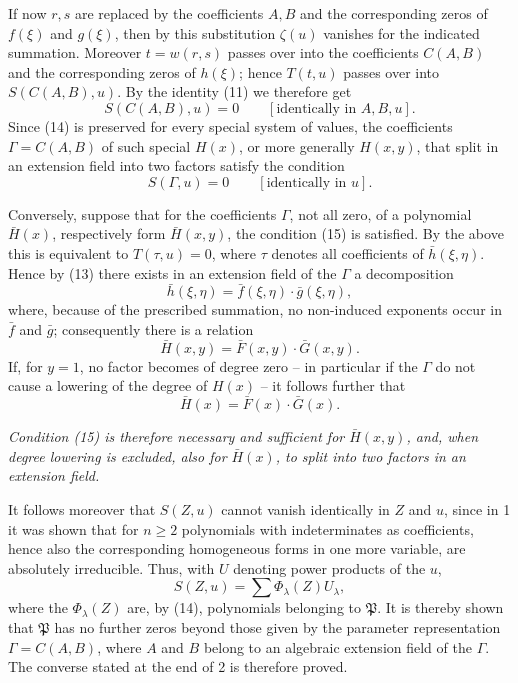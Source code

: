 \documentclass[11pt]{article}
\begin{document}
If now $r,s$ are replaced by the coefficients $A,B$ and the corresponding zeros of $f(\xi)$ and $g(\xi)$, then by this substitution $\zeta(u)$ vanishes for the indicated summation. Moreover $t=w(r,s)$ passes over into the coefficients $C(A,B)$ and the corresponding zeros of $h(\xi)$; hence $T(t,u)$ passes over into $S(C(A,B),u)$. By the identity (11) we therefore get
\begin{equation}
 S(C(A,B),u)=0\qquad[\text{identically in }A,B,u].
\tag{14}
\end{equation}
Since (14) is preserved for every special system of values, the coefficients $\Gamma=C(A,B)$ of such special $H(x)$, or more generally $H(x,y)$, that split in an extension field into two factors satisfy the condition
\begin{equation}
 S(\Gamma,u)=0\qquad[\text{identically in }u].
\tag{15}
\end{equation}

Conversely, suppose that for the coefficients $\Gamma$, not all zero, of a polynomial $\bar H(x)$, respectively form $\bar H(x,y)$, the condition (15) is satisfied. By the above this is equivalent to $T(\tau,u)=0$, where $\tau$ denotes all coefficients of $\bar h(\xi,\eta)$. Hence by (13) there exists in an extension field of the $\Gamma$ a decomposition
\[
 \bar h(\xi,\eta)=\bar f(\xi,\eta)\cdot\bar g(\xi,\eta),
\]
where, because of the prescribed summation, no non-induced exponents occur in $\bar f$ and $\bar g$; consequently there is a relation
\[
 \bar H(x,y)=\bar F(x,y)\cdot\bar G(x,y).
\]
If, for $y=1$, no factor becomes of degree zero -- in particular if the $\Gamma$ do not cause a lowering of the degree of $H(x)$ -- it follows further that
\[
 \bar H(x)=\bar F(x)\cdot\bar G(x).
\]

\emph{Condition (15) is therefore necessary and sufficient for $\bar H(x,y)$, and, when degree lowering is excluded, also for $\bar H(x)$, to split into two factors in an extension field.}

It follows moreover that $S(Z,u)$ cannot vanish identically in $Z$ and $u$, since in 1 it was shown that for $n\ge2$ polynomials with indeterminates as coefficients, hence also the corresponding homogeneous forms in one more variable, are absolutely irreducible. Thus, with $U$ denoting power products of the $u$,
\[
 S(Z,u)=\sum \Phi_\lambda(Z)U_\lambda,
\]
where the $\Phi_\lambda(Z)$ are, by (14), polynomials belonging to $\mathfrak P$. It is thereby shown that $\mathfrak P$ has no further zeros beyond those given by the parameter representation $\Gamma=C(A,B)$, where $A$ and $B$ belong to an algebraic extension field of the $\Gamma$. The converse stated at the end of 2 is therefore proved.
\end{document}

